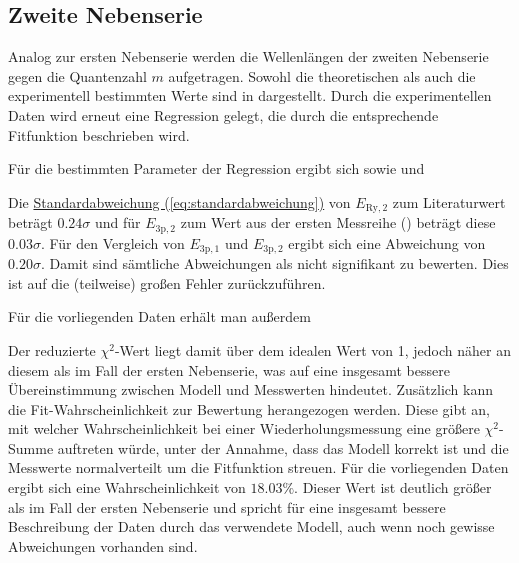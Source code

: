 \subsection*{Zweite Nebenserie}
Analog zur ersten Nebenserie werden die Wellenlängen der zweiten Nebenserie gegen die Quantenzahl $m$ aufgetragen. Sowohl die theoretischen als auch die experimentell bestimmten Werte sind in  dargestellt. Durch die experimentellen Daten wird erneut eine Regression gelegt, die durch die entsprechende Fitfunktion beschrieben wird.


Für die bestimmten Parameter der Regression ergibt sich
sowie
und

Die \hyperref[eq:standardabweichung]{Standardabweichung (\ref*{eq:standardabweichung})} von $E_{\text{Ry},2}$ zum Literaturwert beträgt $0.24\sigma$ und für $E_{\text{3p},2}$ zum Wert aus der ersten Messreihe () beträgt diese $0.03\sigma$. Für den Vergleich von $E_{\text{3p},1}$ und $E_{\text{3p},2}$ ergibt sich eine Abweichung von $0.20\sigma$. Damit sind sämtliche Abweichungen als nicht signifikant zu bewerten.
Dies ist auf die (teilweise) großen Fehler zurückzuführen.

Für die vorliegenden Daten erhält man außerdem

Der reduzierte $\chi^2$-Wert liegt damit über dem idealen Wert von 1, jedoch näher an diesem als im Fall der ersten Nebenserie, was auf eine insgesamt bessere Übereinstimmung zwischen Modell und Messwerten hindeutet.
Zusätzlich kann die Fit-Wahrscheinlichkeit zur Bewertung herangezogen werden. Diese gibt an, mit welcher Wahrscheinlichkeit bei einer Wiederholungsmessung eine größere $\chi^2$-Summe auftreten würde, unter der Annahme, dass das Modell korrekt ist und die Messwerte normalverteilt um die Fitfunktion streuen. Für die vorliegenden Daten ergibt sich eine Wahrscheinlichkeit von $18.03\%$. Dieser Wert ist deutlich größer als im Fall der ersten Nebenserie und spricht für eine insgesamt bessere Beschreibung der Daten durch das verwendete Modell, auch wenn noch gewisse Abweichungen vorhanden sind.
